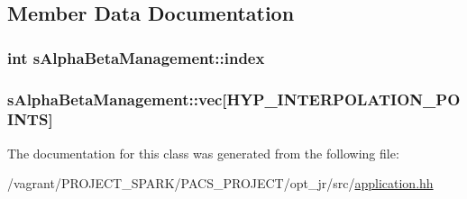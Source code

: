 \subsection{Member Data Documentation}
\hypertarget{classsAlphaBetaManagement_acfd2318c63ee03cd1e25904deedfe88f}{
\subsubsection[{index}]{\setlength{\rightskip}{0pt plus 5cm}int s\-Alpha\-Beta\-Management\-::index}}\label{classsAlphaBetaManagement_acfd2318c63ee03cd1e25904deedfe88f}
\hypertarget{classsAlphaBetaManagement_af9fd5945bd8e0566f69804372b5ca01d}{
\subsubsection[{vec}]{ s\-Alpha\-Beta\-Management\-::vec\mbox{[}{\bf H\-Y\-P\-\_\-\-I\-N\-T\-E\-R\-P\-O\-L\-A\-T\-I\-O\-N\-\_\-\-P\-O\-I\-N\-T\-S}\mbox{]}}}\label{classsAlphaBetaManagement_af9fd5945bd8e0566f69804372b5ca01d}


The documentation for this class was generated from the following file\-:\begin{DoxyCompactItemize}
\item 
/vagrant/\-P\-R\-O\-J\-E\-C\-T\-\_\-\-S\-P\-A\-R\-K/\-P\-A\-C\-S\-\_\-\-P\-R\-O\-J\-E\-C\-T/opt\-\_\-jr/src/\hyperlink{application_8hh}{application.\-hh}\end{DoxyCompactItemize}
